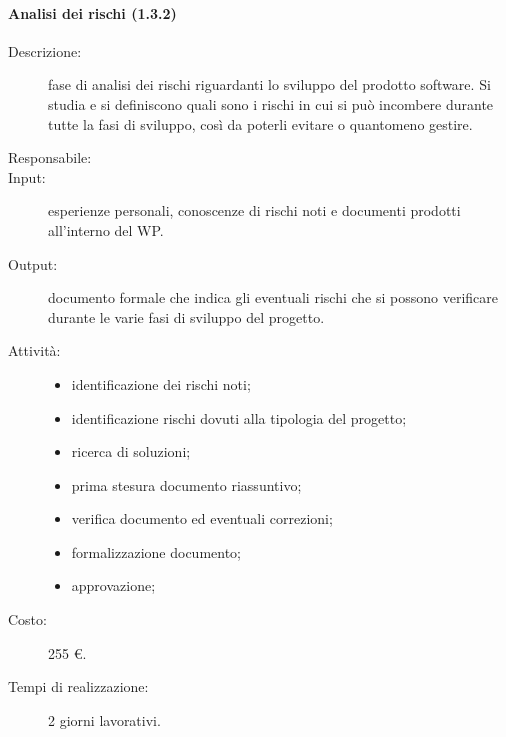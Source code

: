 \paragraph{Analisi dei rischi (1.3.2)}
\begin{description}
\item[Descrizione:] fase di analisi dei rischi riguardanti lo sviluppo del prodotto software. Si studia e si definiscono quali sono i rischi in cui si può incombere durante tutte la fasi di sviluppo, così da poterli evitare o quantomeno gestire.
\item[Responsabile:] 
\item[Input:] esperienze personali, conoscenze di rischi noti e documenti prodotti all'interno del WP.
\item[Output:] documento formale che indica gli eventuali rischi che si possono verificare durante le varie fasi di sviluppo del progetto.
\item[Attività:] 
\begin{center}
\begin{itemize}
\item identificazione dei rischi noti;
\item identificazione rischi dovuti alla tipologia del progetto;
\item ricerca di soluzioni;
\item prima stesura documento riassuntivo;
\item verifica documento ed eventuali correzioni;
\item formalizzazione documento;
\item approvazione;
\end{itemize}
\end{center}
\item[Costo:] 255 \euro{}.
\item[Tempi di realizzazione:] 2 giorni lavorativi.
\end{description}

